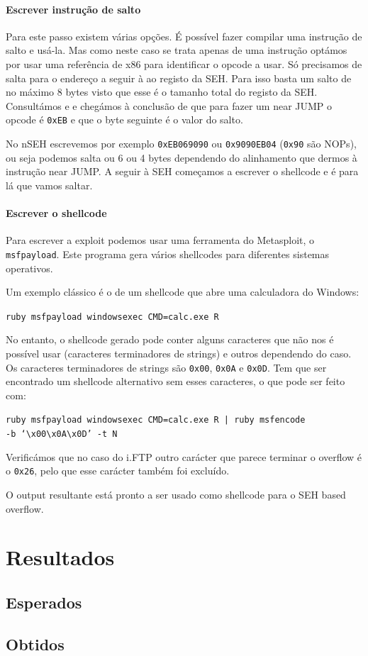 \documentclass[a4paper]{article}
\begin{document}
\paragraph*{Escrever instrução de salto} Para este passo existem várias opções. É possível fazer compilar uma instrução de salto e usá-la. Mas como neste caso se trata apenas de uma instrução optámos por usar uma referência de x86 para identificar o opcode a usar. Só precisamos de salta para o endereço a seguir à ao registo da SEH. Para isso basta um salto de no máximo 8 bytes visto que esse é o tamanho total do registo da SEH. Consultámos \cite{AMD64vol3_2013} e \cite{refx86asm} e chegámos à conclusão de que para fazer um near JUMP o opcode é \texttt{0xEB} e que o byte seguinte é o valor do salto.

No nSEH escrevemos por exemplo \texttt{0xEB069090} ou \texttt{0x9090EB04} (\texttt{0x90} são NOPs), ou seja podemos salta ou 6 ou 4 bytes dependendo do alinhamento que dermos à instrução near JUMP. A seguir à SEH começamos a escrever o shellcode e é para lá que vamos saltar.

\paragraph*{Escrever o shellcode} Para escrever a exploit podemos usar uma ferramenta do Metasploit, o \texttt{msfpayload}. Este programa gera vários shellcodes para diferentes sistemas operativos.

Um exemplo clássico é o de um shellcode que abre uma calculadora do Windows:

	\texttt{ruby msfpayload windows\/exec CMD=calc.exe R}

No entanto, o shellcode gerado pode conter alguns caracteres que não nos é possível usar (caracteres terminadores de strings) e outros dependendo do caso. Os caracteres terminadores de strings são \texttt{0x00}, \texttt{0x0A} e \texttt{0x0D}. Tem que ser encontrado um shellcode alternativo sem esses caracteres, o que pode ser feito com:

	\texttt{ruby msfpayload windows\/exec CMD=calc.exe R | ruby msfencode \\ -b `\textbackslash x00\textbackslash x0A\textbackslash x0D' -t N}

Verificámos que no caso do i.FTP outro carácter que parece terminar o overflow é o \texttt{0x26}, pelo que esse carácter também foi excluído.

O output resultante está pronto a ser usado como shellcode para o SEH based overflow.


\pagebreak
\section{Resultados}

\subsection{Esperados}
\subsection{Obtidos}


\pagebreak

\nocite{CorelanTeam, refx86asm, genSEHexploits, AMD64vol3_2013}
\end{document}
